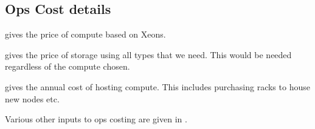\subsection{Ops Cost details}\label{sec:opsdetails}
 gives the price of compute based on Xeons.

 gives the price of storage using all  types that we need.
This would be needed regardless of the compute chosen.



 gives the annual cost of hosting compute. This includes purchasing racks to house
new nodes etc.


Various other inputs to ops costing are given in .

